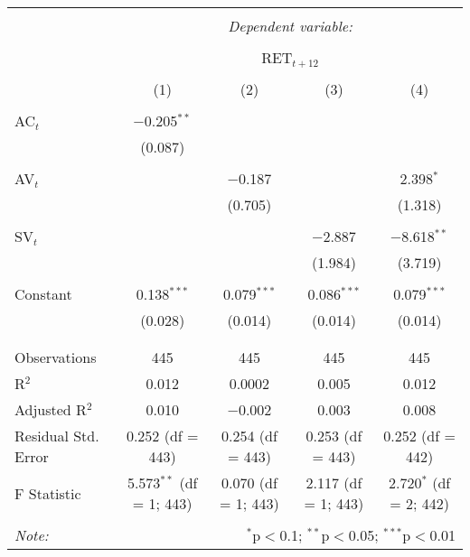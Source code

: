 
\begin{table}[!htbp] \centering 
  \caption{} 
  \label{} 
\begin{tabular}{@{\extracolsep{5pt}}lcccc} 
\\[-1.8ex]\hline 
\hline \\[-1.8ex] 
 & \multicolumn{4}{c}{\textit{Dependent variable:}} \\ 
\cline{2-5} 
\\[-1.8ex] & \multicolumn{4}{c}{RET$_{t+12}$} \\ 
\\[-1.8ex] & (1) & (2) & (3) & (4)\\ 
\hline \\[-1.8ex] 
 AC$_{t}$ & $-$0.205$^{**}$ &  &  &  \\ 
  & (0.087) &  &  &  \\ 
  & & & & \\ 
 AV$_{t}$ &  & $-$0.187 &  & 2.398$^{*}$ \\ 
  &  & (0.705) &  & (1.318) \\ 
  & & & & \\ 
 SV$_{t}$ &  &  & $-$2.887 & $-$8.618$^{**}$ \\ 
  &  &  & (1.984) & (3.719) \\ 
  & & & & \\ 
 Constant & 0.138$^{***}$ & 0.079$^{***}$ & 0.086$^{***}$ & 0.079$^{***}$ \\ 
  & (0.028) & (0.014) & (0.014) & (0.014) \\ 
  & & & & \\ 
\hline \\[-1.8ex] 
Observations & 445 & 445 & 445 & 445 \\ 
R$^{2}$ & 0.012 & 0.0002 & 0.005 & 0.012 \\ 
Adjusted R$^{2}$ & 0.010 & $-$0.002 & 0.003 & 0.008 \\ 
Residual Std. Error & 0.252 (df = 443) & 0.254 (df = 443) & 0.253 (df = 443) & 0.252 (df = 442) \\ 
F Statistic & 5.573$^{**}$ (df = 1; 443) & 0.070 (df = 1; 443) & 2.117 (df = 1; 443) & 2.720$^{*}$ (df = 2; 442) \\ 
\hline 
\hline \\[-1.8ex] 
\textit{Note:}  & \multicolumn{4}{r}{$^{*}$p$<$0.1; $^{**}$p$<$0.05; $^{***}$p$<$0.01} \\ 
\end{tabular} 
\end{table} 
